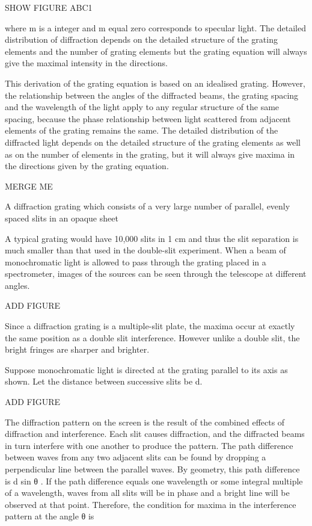 SHOW FIGURE ABC1

where m is a integer and m equal zero corresponds to specular light. 
The detailed distribution of diffraction depends on the detailed structure of the grating elements and the number of grating elements but the grating equation will always give the maximal intensity in the directions.

This derivation of the grating equation is based on an idealised grating. However, the relationship between the angles of the diffracted beams, the grating spacing and the wavelength of the light apply to any regular structure of the same spacing, because the phase relationship between light scattered from adjacent elements of the grating remains the same. The detailed distribution of the diffracted light depends on the detailed structure of the grating elements as well as on the number of elements in the grating, but it will always give maxima in the directions given by the grating equation.


MERGE ME

A diffraction grating which consists of a very large number of parallel, evenly spaced slits in an opaque sheet

A typical grating would have 10,000 slits in 1 cm and thus the slit separation is much smaller than that used in the double-slit experiment. When a beam of monochromatic light is allowed to pass through the grating placed in a spectrometer, images of the sources can be seen through the telescope at different angles.

ADD FIGURE

Since a diffraction grating is a multiple-slit plate, the maxima occur at exactly the same position as a double slit interference. However unlike a double slit, the bright fringes are sharper and brighter.

Suppose monochromatic light is directed at the grating parallel to its axis as shown. Let the distance between successive slits be d.

ADD FIGURE

The diffraction pattern on the screen is the result of the combined effects of diffraction and interference. Each slit causes diffraction, and the diffracted beams in turn interfere with one another to produce the pattern. The path difference between waves from any two adjacent slits can be found by dropping a perpendicular line between the parallel waves. By geometry, this path difference is d sin θ . If the path difference equals one wavelength or some integral multiple of a wavelength, waves from all slits will be in phase and a bright line will be observed at that point. Therefore, the condition for maxima in the interference pattern at the angle θ is 

